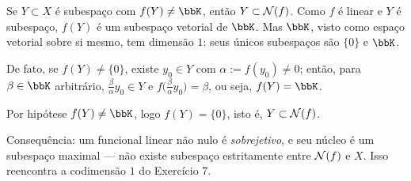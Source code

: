 \begin{exercicio}{Se $Y\subset X$ é subespaço com $f(Y)\neq\K$, então $Y\subset\mathcal{N}(f)$.}
\sol
Como $f$ é linear e $Y$ é subespaço, $f(Y)$ é um subespaço vetorial de $\K$. Mas $\K$, visto como espaço vetorial sobre si mesmo, tem dimensão $1$: seus únicos subespaços são $\{0\}$ e $\K$.

De fato, se $f(Y)\neq\{0\}$, existe $y_0\in Y$ com $\alpha:=f(y_0)\neq0$; então, para $\beta\in\K$ arbitrário, $\frac{\beta}{\alpha}y_0\in Y$ e $f\bigl(\frac{\beta}{\alpha}y_0\bigr)=\beta$, ou seja, $f(Y)=\K$.

Por hipótese $f(Y)\neq\K$, logo $f(Y)=\{0\}$, isto é, $Y\subset\mathcal{N}(f)$.

\begin{obs}
Consequência: um funcional linear não nulo é \emph{sobrejetivo}, e seu núcleo é um subespaço maximal --- não existe subespaço estritamente entre $\mathcal{N}(f)$ e $X$. Isso reencontra a codimensão $1$ do Exercício 7.
\end{obs}
\end{exercicio}

